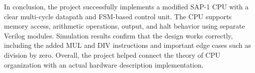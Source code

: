 \documentclass[12pt,a4paper]{article}
\begin{document}
In conclusion, the project successfully implements a modified SAP-1 CPU with a clear multi-cycle datapath and FSM-based control unit. The CPU supports memory access, arithmetic operations, output, and halt behavior using separate Verilog modules. Simulation results confirm that the design works correctly, including the added MUL and DIV instructions and important edge cases such as division by zero. Overall, the project helped connect the theory of CPU organization with an actual hardware description implementation.
\end{document}
